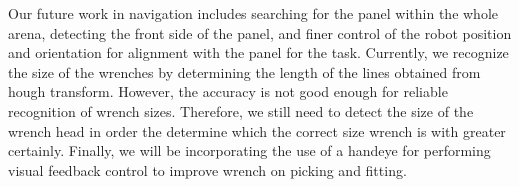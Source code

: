 Our future work in navigation includes searching for the panel within the whole arena, detecting the front side of the panel, and finer control of the robot position and orientation for alignment with the panel for the task. Currently, we recognize the size of the wrenches by determining the length of the lines obtained from hough transform. However, the accuracy is not good enough for reliable recognition of wrench sizes. Therefore, we still need to detect the size of the wrench head in order the determine which the correct size wrench is with greater certainly. Finally, we will be incorporating the use of a handeye for performing visual feedback control to improve wrench on picking and fitting.
